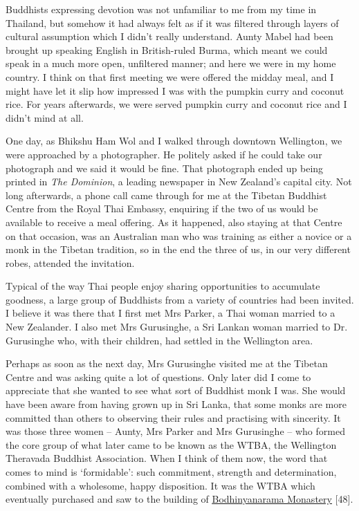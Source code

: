 Buddhists expressing devotion was not unfamiliar to me from my time in
Thailand, but somehow it had always felt as if it was filtered through
layers of cultural assumption which I didn't really understand. Aunty
Mabel had been brought up speaking English in British-ruled Burma, which
meant we could speak in a much more open, unfiltered manner; and here we
were in my home country. I think on that first meeting we were offered
the midday meal, and I might have let it slip how impressed I was with
the pumpkin curry and coconut rice. For years afterwards, we were served
pumpkin curry and coconut rice and I didn't mind at all.

One day, as Bhikshu Ham Wol and I walked through downtown Wellington, we
were approached by a photographer. He politely asked if he could take
our photograph and we said it would be fine. That photograph ended up
being printed in \emph{The Dominion}, a leading newspaper in New
Zealand's capital city. Not long afterwards, a phone call came through
for me at the Tibetan Buddhist Centre from the Royal Thai Embassy,
enquiring if the two of us would be available to receive a meal
offering. As it happened, also staying at that Centre on that occasion,
was an Australian man who was training as either a novice or a monk in
the Tibetan tradition, so in the end the three of us, in our very
different robes, attended the invitation.

Typical of the way Thai people enjoy sharing opportunities to accumulate
goodness, a large group of Buddhists from a variety of countries had
been invited. I believe it was there that I first met Mrs Parker, a Thai
woman married to a New Zealander. I also met Mrs Gurusinghe, a Sri
Lankan woman married to Dr. Gurusinghe who, with their children, had
settled in the Wellington area.

Perhaps as soon as the next day, Mrs Gurusinghe visited me at the
Tibetan Centre and was asking quite a lot of questions. Only later did I
come to appreciate that she wanted to see what sort of Buddhist monk I
was. She would have been aware from having grown up in Sri Lanka, that
some monks are more committed than others to observing their rules and
practising with sincerity. It was those three women -- Aunty, Mrs Parker
and Mrs Gurusinghe -- who formed the core group of what later came to be
known as the WTBA, the Wellington Theravada Buddhist Association. When I
think of them now, the word that comes to mind is `formidable': such
commitment, strength and determination, combined with a wholesome, happy
disposition. It was the WTBA which eventually purchased and saw to the
building of
\href{https://forestsangha.org/community/monasteries/bodhinyanarama}{\underline{Bodhinyanarama
Monastery}} {[}48{]}.

